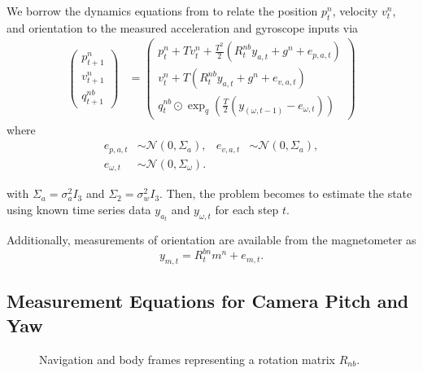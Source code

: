 \documentclass{article}
\begin{document}
We borrow the dynamics equations from \cite{usinginertialsensors} to relate the position $p_t^n$, velocity $v_t^n$, and orientation to the measured acceleration and gyroscope inputs via
\begin{align}
\begin{pmatrix}
    p_{t + 1}^n\\
    v_{t + 1}^n\\
    q_{t + 1}^{nb}
    \end{pmatrix} &=
    \begin{pmatrix}
    p_t^n + T v_t^n + \frac{T^2}{2}(R_t^{nb}  y_{a,t} + g^n + e_{p,a,t})\\
    v_t^n + T (R_t^{nb}  y_{a,t} + g^n + e_{v,a,t})\\
    q_{t}^{nb} \odot \exp_q\left(\frac{T}{2} (y_(\omega, t-1) - e_{\omega,t})\right)
    \end{pmatrix}
\end{align}
where 
\begin{align*}
    e_{p,a,t} &\sim \mathcal{N}(0, \Sigma_a), 
    &e_{v,a,t} &\sim \mathcal{N}(0, \Sigma_a),\\
    e_{\omega,t} &\sim \mathcal{N}(0, \Sigma_\omega).
\end{align*}

with $\Sigma_a = \sigma_a^2 I_3$ and $\Sigma_2 = \sigma_w^2 I_3$. Then, the problem becomes to estimate the state using known time series data $y_{a_t}$ and $y_{\omega,t}$ for each step $t$.

Additionally, measurements of orientation are available from the magnetometer as
\begin{equation}
    y_{m,t} = R_t^{bn} m^n + e_{m,t}.
\end{equation}


\subsection{Measurement Equations for Camera Pitch and Yaw}
\label{sec:pitchyawmeas}
\begin{figure}[htbp]%
    \centering
    \caption{Navigation and body frames representing a rotation matrix $R_{nb}$.}%
    \label{fig:frames}
\end{figure}
\end{document}
